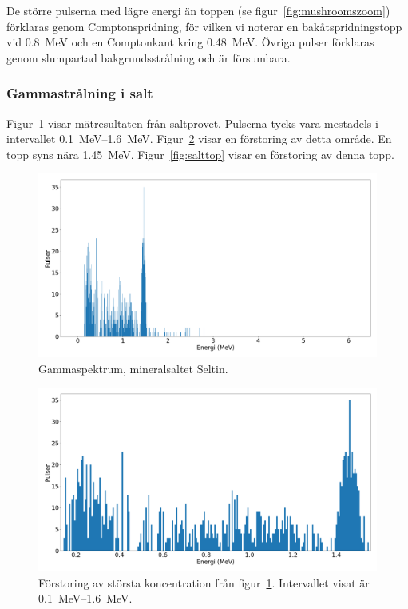De större pulserna med lägre energi än toppen (se
figur~\ref{fig:mushroomszoom}) förklaras genom Comptonspridning, för vilken
vi noterar en bakåtspridningstopp vid \qty{0.8}{\MeV} och en Comptonkant kring
\qty{0.48}{\MeV}. Övriga pulser förklaras genom slumpartad bakgrundsstrålning
och är försumbara.

\subsubsection{Gammastrålning i salt}

Figur~\ref{fig:salt} visar mätresultaten från saltprovet. Pulserna tycks vara
mestadels i intervallet \qtyrange{0.1}{1.6}{\MeV}. Figur~\ref{fig:saltzoom}
visar en förstoring av detta område. En topp syns nära \qty{1.45}{\MeV}.
Figur~\ref{fig:salttop} visar en förstoring av denna topp.

\begin{figure}[!hp]
    \centering
    \includegraphics[width=\textwidth, keepaspectratio]{../images/salt.png}
    \caption{Gammaspektrum, mineralsaltet Seltin.}
    \label{fig:salt}
\end{figure}

\begin{figure}[!hp]
    \centering
    \includegraphics[width=\textwidth, keepaspectratio]{../images/salt_zoom.png}
    \caption{
        Förstoring av största koncentration från figur~\ref{fig:salt}.
        Intervallet visat är \qtyrange{0.1}{1.6}{\MeV}.
    }
    \label{fig:saltzoom}
\end{figure}

